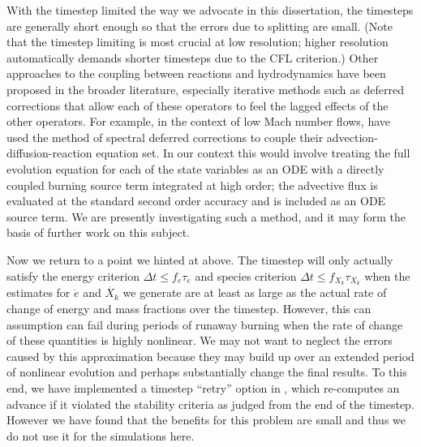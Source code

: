 \documentclass[12pt]{article}
\begin{document}
With the timestep limited the way we advocate in this dissertation,
the timesteps are generally short enough so that the errors
due to splitting are small. (Note that the timestep limiting is
most crucial at low resolution; higher resolution automatically demands
shorter timesteps due to the CFL criterion.) Other approaches to the coupling
between reactions and hydrodynamics have been proposed in the
broader literature, especially iterative methods such as
deferred corrections that allow each of these operators to
feel the lagged effects of the other operators. For example,
in the context of low Mach number flows, \cite{nonaka:2012} have
used the method of spectral deferred corrections \citep{SDC} to
couple their advection-diffusion-reaction equation set. In our
context this would involve treating the full evolution equation
for each of the state variables as an ODE with a directly coupled
burning source term integrated at high order; the advective
flux is evaluated at the standard second order accuracy
and is included as an ODE source term.
We are presently investigating such a method,
and it may form the basis of further work on this subject.

Now we return to a point we hinted at above. The timestep
will only actually satisfy the energy criterion
$\Delta t \leq f_e \tau_e$ and species criterion
$\Delta t \leq f_{X_k} \tau_{X_k}$ when the estimates for
$\dot{e}$ and $\dot{X_k}$ we generate are at least as large
as the actual rate of change of energy and mass fractions
over the timestep. However, this can assumption can fail
during periods of runaway burning when the rate of change
of these quantities is highly nonlinear. We may not want
to neglect the errors caused by this approximation
because they may build up over an extended period of nonlinear
evolution and perhaps substantially change the final results.
To this end, we have implemented a timestep ``retry'' option in
\castro, which re-computes an advance if it violated the
stability criteria as judged from the end of the timestep.
However we have found that the benefits for this problem are
small and thus we do not use it for the simulations here.
\end{document}
